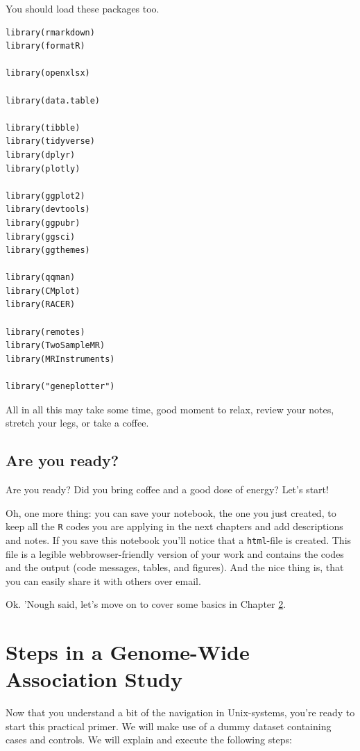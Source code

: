 \documentclass[
]{book}
\newcommand{\passthrough}[1]{#1}
\begin{document}
You should load these packages too.

\begin{lstlisting}
library(rmarkdown)
library(formatR)

library(openxlsx)

library(data.table)

library(tibble)
library(tidyverse)
library(dplyr)
library(plotly)

library(ggplot2)
library(devtools)
library(ggpubr)
library(ggsci)
library(ggthemes)

library(qqman)
library(CMplot)
library(RACER)

library(remotes)
library(TwoSampleMR)
library(MRInstruments)

library("geneplotter")
\end{lstlisting}

All in all this may take some time, good moment to relax, review your notes, stretch your legs, or take a coffee.

\hypertarget{are-you-ready}{%
\section{Are you ready?}\label{are-you-ready}}

Are you ready? Did you bring coffee and a good dose of energy? Let's start!

Oh, one more thing: you can save your notebook, the one you just created, to keep all the \passthrough{\lstinline!R!} codes you are applying in the next chapters and add descriptions and notes. If you save this notebook you'll notice that a \passthrough{\lstinline!html!}-file is created. This file is a legible webbrowser-friendly version of your work and contains the codes and the output (code messages, tables, and figures). And the nice thing is, that you can easily share it with others over email.

Ok. 'Nough said, let's move on to cover some basics in Chapter \ref{gwas-basics}.

\hypertarget{gwas-basics}{%
\chapter{Steps in a Genome-Wide Association Study}\label{gwas-basics}}

Now that you understand a bit of the navigation in Unix-systems, you're ready to start this practical primer. We will make use of a dummy dataset containing cases and controls. We will explain and execute the following steps:
\end{document}
